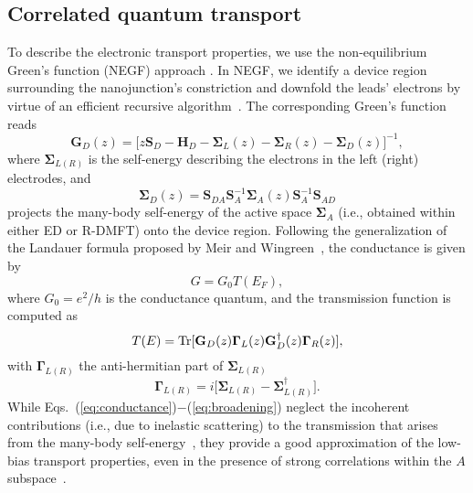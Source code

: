 \documentclass[aps,prx,twocolumn,superscriptaddress]{revtex4-2}
\begin{document}
\subsection{Correlated quantum transport}
To describe the electronic transport properties, we use the non-equilibrium Green's function (NEGF) approach \cite{datta2005quantum,ryndyk2016theory}. In NEGF, we identify a device region surrounding the nanojunction's constriction and downfold the leads' electrons by virtue of an efficient recursive algorithm~\cite{gandus2020efficient}. 
The corresponding Green's function reads  
\begin{equation}
    \mathbf{G}_D(z) = \big[  z\mathbf{S}_D - \mathbf{H}_D 
                            - \mathbf{\Sigma}_L(z) - \mathbf{\Sigma}_R(z) -\mathbf{\Sigma}_D(z) \big]^{-1},
\end{equation}
where $\mathbf{\Sigma}_{L(R)}$ is the self-energy describing the electrons in the left (right) electrodes, and
\begin{equation}
  \mathbf{\Sigma}_D(z) = \mathbf{S}_{DA} \mathbf{S}^{-1}_A \mathbf{\Sigma}_A(z) \mathbf{S}^{-1}_A \mathbf{S}_{AD}
\end{equation} 
projects the many-body self-energy of the active space $\mathbf{\Sigma}_A$ (i.e., obtained within either ED or R-DMFT) onto the device region.
Following the generalization of the Landauer formula proposed by Meir and Wingreen~\cite{meir1992landauer}, the conductance is given by 
\begin{equation} \label{eq:conductance}
    G = G_0 T(E_F),
\end{equation}
where $G_0=e^2/h$ is the conductance quantum, and the transmission function is computed as
\begin{equation} \label{eq:transmission}
    T(E) = \Trace [\mathbf{G}_D(z) \mathbf{\Gamma}_L(z) \mathbf{G}^{\dagger}_D(z) \mathbf{\Gamma}_R(z)],
\end{equation}
with $\mathbf{\Gamma}_{L(R)}$ the anti-hermitian part of $\mathbf{\Sigma}_{L(R)}$
\begin{equation} \label{eq:broadening}
    \mathbf{\Gamma}_{L(R)} = i \big[\mathbf{\Sigma}_{L(R)} - \mathbf{\Sigma}^\dagger_{L(R)}\big].
\end{equation}
While Eqs.~(\ref{eq:conductance})$-$(\ref{eq:broadening}) neglect the incoherent contributions 
(i.e., due to inelastic scattering) to the transmission that arises from the many-body self-energy~\cite{rumetshofer2019first,ferretti2005first,ng1996ac,sergueev2002spin,droghettiPRB105,droghettiPRB106}, 
they provide a good approximation of the low-bias transport properties, even in the presence of strong correlations within the $A$ subspace~\cite{meir1992landauer,jacob2015towards}. 
\end{document}

